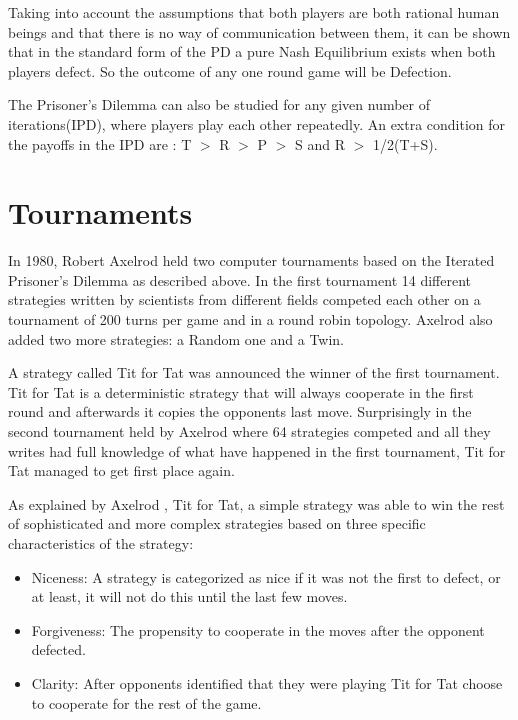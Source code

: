 Taking into account the assumptions that both players are both rational human
beings and that there is no way of communication between them, it can be shown
that in the standard form of the PD a pure Nash Equilibrium exists when both
players defect.  So the outcome of any one round game will be Defection.

The Prisoner’s Dilemma can also be studied for any given number of
iterations(IPD), where players play each other repeatedly. An extra condition
for the payoffs in the IPD are : T \(>\) R \(>\) P \(>\) S and R \(>\) 1/2(T+S).

\section{Tournaments}

In 1980, Robert Axelrod held two computer tournaments based on the Iterated
Prisoner's Dilemma as described above.
In the first tournament 14 different
strategies written by scientists from different fields competed each other on a
tournament of 200 turns per game and in a round robin topology. Axelrod also added
two more strategies: a Random one and a Twin.

A strategy called Tit for Tat was announced the winner of the first tournament.
Tit for Tat is a deterministic strategy that will always cooperate in the first
round and afterwards it copies the opponents last move. Surprisingly in the
second tournament held by Axelrod \parencite{Axelrod1980a} where 64 strategies
competed and all they writes had full knowledge of what have happened in the
first tournament, Tit for Tat managed to get first place again.

As explained by Axelrod \parencite{Axelrod1980b}, Tit for Tat, a simple strategy was able to
win the rest of sophisticated and more complex strategies based on three specific
characteristics of the strategy:

\begin{itemize}
  \item Niceness:  A strategy is categorized as nice if it was not the
                    first to defect, or at least, it will not do this until
                    the last few moves.
  \item Forgiveness: The propensity to cooperate in the moves after the
                     opponent defected.
  \item Clarity: After opponents identified that they were playing Tit for Tat
                 choose to cooperate for the rest of the game.
\end{itemize}

